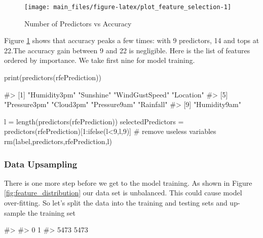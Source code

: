 \begin{Schunk}
\begin{figure}[H]

{\centering \texttt{[image: main\_files/figure-latex/plot\_feature\_selection-1]} 

}

\caption[Number of Predictors vs Accuracy]{Number of Predictors vs Accuracy}\label{fig:plot_feature_selection}
\end{figure}
\end{Schunk}

Figure \ref{fig:plot_feature_selection} shows that accuracy peaks a few
times: with 9 predictors, 14 and tops at 22.The accuracy gain between 9
and 22 is negligible. Here is the list of features ordered by
importance. We take first nine for model training.

\begin{Schunk}
\begin{Sinput}
print(predictors(rfePrediction))
\end{Sinput}
\begin{Soutput}
#> [1] "Humidity3pm"   "Sunshine"      "WindGustSpeed" "Location"     
#> [5] "Pressure3pm"   "Cloud3pm"      "Pressure9am"   "Rainfall"     
#> [9] "Humidity9am"
\end{Soutput}
\end{Schunk}

\begin{Schunk}
\begin{Sinput}
l = length(predictors(rfePrediction))
selectedPredictors =  predictors(rfePrediction)[1:ifelse(l<9,l,9)]
# remove useless variables
rm(label,predictors,rfePrediction,l)
\end{Sinput}
\end{Schunk}

\hypertarget{data-upsampling}{%
\subsubsection{Data Upsampling}\label{data-upsampling}}

There is one more step before we get to the model training. As shown in
Figure \ref{fig:feature_distribution} our data set is unbalanced. This
could cause model over-fitting. So let's split the data into the
training and testing sets and up-sample the training set

\begin{Schunk}
\begin{Soutput}
#> 
#>    0    1 
#> 5473 5473
\end{Soutput}
\end{Schunk}

